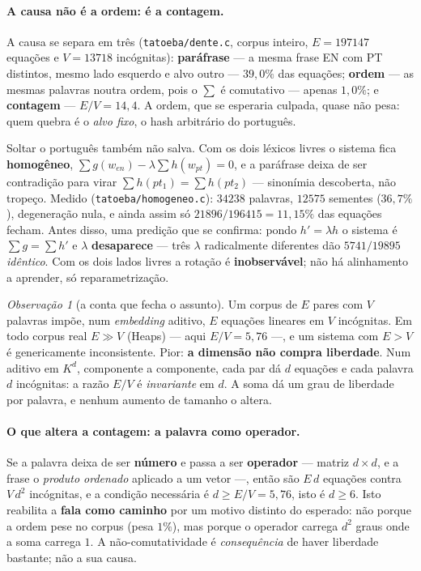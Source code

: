\documentclass[11pt]{article}
\newcommand{\code}[1]{\texttt{\small #1}}
\theoremstyle{plain}
\theoremstyle{remark}
\newtheorem{obs}{Observação}
\begin{document}
\paragraph{A causa não é a ordem: é a contagem.} A causa se separa em três
(\code{tatoeba/dente.c}, corpus inteiro, $E=197147$ equações e $V=13718$ incógnitas):
\textbf{paráfrase} --- a mesma frase EN com PT distintos, mesmo lado esquerdo e alvo outro --- $39{,}0\%$
das equações; \textbf{ordem} --- as mesmas palavras noutra ordem, pois o $\sum$ é comutativo --- apenas
$1{,}0\%$; e \textbf{contagem} --- $E/V=14{,}4$. A ordem, que se esperaria culpada, quase não pesa:
quem quebra é o \emph{alvo fixo}, o hash arbitrário do português.

Soltar o português também não salva. Com os dois léxicos livres o sistema fica \textbf{homogêneo},
$\sum g(w_{en})-\lambda\sum h(w_{pt})=0$, e a paráfrase deixa de ser contradição para virar
$\sum h(pt_1)=\sum h(pt_2)$ --- sinonímia descoberta, não tropeço. Medido
(\code{tatoeba/homogeneo.c}): $34238$ palavras, $12575$ sementes ($36{,}7\%$), degeneração nula, e
ainda assim só $21896/196415=11{,}15\%$ das equações fecham. Antes disso, uma predição que se confirma:
pondo $h'=\lambda h$ o sistema é $\sum g=\sum h'$ e $\lambda$ \textbf{desaparece} --- três $\lambda$
radicalmente diferentes dão $5741/19895$ \emph{idêntico}. Com os dois lados livres a rotação é
\textbf{inobservável}; não há alinhamento a aprender, só reparametrização.

\begin{obs}[a conta que fecha o assunto]
Um corpus de $E$ pares com $V$ palavras impõe, num \emph{embedding} aditivo, $E$ equações lineares em
$V$ incógnitas. Em todo corpus real $E\gg V$ (Heaps) --- aqui $E/V=5{,}76$ ---, e um sistema com $E>V$
é genericamente inconsistente. Pior: \textbf{a dimensão não compra liberdade}. Num aditivo em $K^d$,
componente a componente, cada par dá $d$ equações e cada palavra $d$ incógnitas: a razão $E/V$ é
\emph{invariante} em $d$. A soma dá um grau de liberdade por palavra, e nenhum aumento de tamanho o
altera.
\end{obs}

\paragraph{O que altera a contagem: a palavra como operador.} Se a palavra deixa de ser \textbf{número}
e passa a ser \textbf{operador} --- matriz $d\times d$, e a frase o \emph{produto ordenado} aplicado a
um vetor ---, então são $E\,d$ equações contra $V\,d^2$ incógnitas, e a condição necessária é
$d\ge E/V=5{,}76$, isto é $\boxed{d\ge6}$. Isto reabilita a \textbf{fala como caminho} por um motivo
distinto do esperado: não porque a ordem pese no corpus (pesa $1\%$), mas porque o operador carrega
$d^2$ graus onde a soma carrega $1$. A não-comutatividade é \emph{consequência} de haver liberdade
bastante; não a sua causa.
\end{document}
